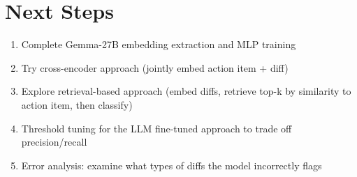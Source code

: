 \documentclass[11pt]{article}
\begin{document}
\section{Next Steps}
\begin{enumerate}
\item Complete Gemma-27B embedding extraction and MLP training
\item Try cross-encoder approach (jointly embed action item + diff)
\item Explore retrieval-based approach (embed diffs, retrieve top-k by similarity to action item, then classify)
\item Threshold tuning for the LLM fine-tuned approach to trade off precision/recall
\item Error analysis: examine what types of diffs the model incorrectly flags
\end{enumerate}
\end{document}
